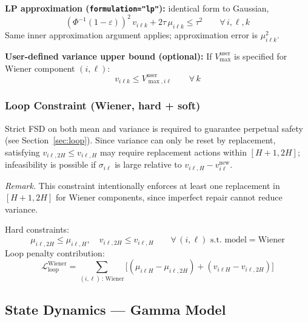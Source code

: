 \documentclass[11pt,a4paper]{article}
\begin{document}
\textbf{LP approximation (\texttt{formulation="lp"}):} identical form to Gaussian,
\begin{equation}
  (\Phi^{-1}(1-\varepsilon))^2\,v_{i\ell k} + 2\tau\,\mu_{i\ell k} \leq \tau^2
  \qquad \forall\, i,\ell,k
  \label{eq:w_lp_reliability}
\end{equation}
Same inner approximation argument applies; approximation error is $\mu_{i\ell k}^2$.

\textbf{User-defined variance upper bound (optional):}
If $V_{\max}^{\mathrm{user}}$ is specified for Wiener component $(i,\ell)$:
\begin{equation}
  v_{i\ell k} \leq V_{\max,i\ell}^{\mathrm{user}} \qquad \forall\, k
\end{equation}

\subsubsection{Loop Constraint (Wiener, hard + soft)}

Strict FSD on both mean and variance is required to guarantee perpetual safety
(see Section~\ref{sec:loop}). Since variance can only be reset by replacement,
satisfying $v_{i\ell,2H} \leq v_{i\ell,H}$ may require replacement actions
within $[H+1,2H]$; infeasibility is possible if $\sigma_{i\ell}$ is large relative
to $v_{i\ell,H} - v^{\mathrm{new}}_{i\ell}$.

\emph{Remark.} This constraint intentionally enforces at least one replacement
in $[H{+}1,2H]$ for Wiener components, since imperfect repair cannot reduce variance.

Hard constraints:
\begin{equation}
  \mu_{i\ell,2H} \leq \mu_{i\ell,H}, \quad
  v_{i\ell,2H} \leq v_{i\ell,H}
  \qquad \forall\,(i,\ell)\text{ s.t. model} = \mathrm{Wiener}
\end{equation}
Loop penalty contribution:
\begin{equation}
  \mathcal{L}^{\mathrm{Wiener}}_{\mathrm{loop}} =
    \sum_{(i,\ell)\,:\,\mathrm{Wiener}}
    \bigl[(\mu_{i\ell H} - \mu_{i\ell,2H}) + (v_{i\ell H} - v_{i\ell,2H})\bigr]
\end{equation}

\subsection{State Dynamics --- Gamma Model}
\label{sec:dyn_gamma}
\end{document}
